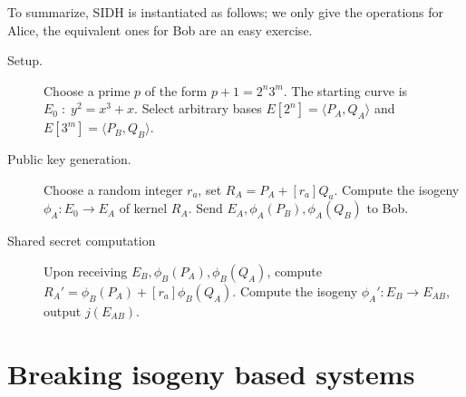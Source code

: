\begin{otherlanguage}{english}
To summarize, SIDH is instantiated as follows; we only give the
operations for Alice, the equivalent ones for Bob are an easy
exercise.
\begin{description}
\item[Setup.] Choose a prime $p$ of the form $p+1=2^n3^m$. The starting
  curve is $E_0\;:\;y^2=x^3+x$. Select arbitrary bases
  $E[2^n]=\langle P_A,Q_A\rangle$ and $E[3^m]=\langle P_B,Q_B\rangle$.
\item[Public key generation.] Choose a random integer $r_a$, set
  $R_A=P_A+[r_a]Q_a$. Compute the isogeny $\phi_A:E_0\to E_A$ of
  kernel $R_A$. Send $E_A,\phi_A(P_B),\phi_A(Q_B)$ to Bob.
\item[Shared secret computation] Upon receiving
  $E_B,\phi_B(P_A),\phi_B(Q_A)$, compute
  $R_A'=\phi_B(P_A)+[r_a]\phi_B(Q_A)$. Compute the isogeny
  $\phi_A':E_B\to E_{AB}$, output $j(E_{AB})$.
\end{description}


\section{Breaking isogeny based systems}




  
\end{otherlanguage}




\EndContrib



